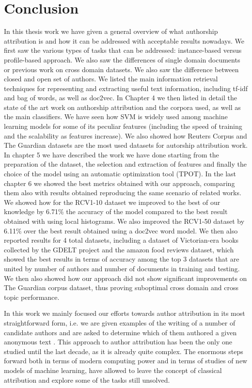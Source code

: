 \chapter{Conclusion}
In this thesis work we have given a general overview of what authorship attribution is and how it can be addressed with acceptable results nowadays.
We first saw the various types of tasks that can be addressed: instance-based versus profile-based approach. We also saw the differences of single domain documents or previous work on cross domain datasets. We also saw the difference between closed and open set of authors.
We listed the main information retrieval techniques for representing and extracting useful text information, including tf-idf and bag of words, as well as doc2vec.
In Chapter 4 we then listed in detail the state of the art work on authorship attribution and the corpora used, as well as the main classifiers. We have seen how SVM is widely used among machine learning models for some of its peculiar features (including the speed of training and the scalability as features increase). We also showed how Reuters Corpus and The Guardian datasets are the most used datasets for autorship attribution work.
In chapter 5 we have described the work we have done starting from the preparation of the dataset, the selection and extraction of features and finally the choice of the model using an automatic optimization tool (TPOT).
In the last chapter 6 we showed the best metrics obtained with our approach, comparing them also with results obtained reproducing the same scenario of related works.
We showed how for the RCV1-10 dataset we improved to the best of our knowledge by 6.71\% the accuracy of the model compared to the best result obtained with using local histograms. We also improved the RCV1-50 dataset by 6.11\% over the best result obtained using a doc2vec word model.
We then also reported results for 4 total datasets, including a dataset of Victorian-era books collected by the GDELT project and the amazon food reviews dataset, which showed the best results in terms of accuracy among the top 3 datasets that are united by number of authors and number of documents in training and testing.
We then also showed how our approach did not show significant improvements on The Guardian corpus dataset, thus proving suboptimal cross domain and cross topic performance.


In this work we mainly focused our efforts towards author attribution in its most straightforward form, i.e. we are given examples of the writing of a number of candidate authors and are asked
to determine which of them authored a given anonymous text \cite{koppel2009computational}.
This approach to author attribution has been the only one studied until the last decade, as it is already quite complex.
The enormous steps forward both in terms of modern computing power and in terms of studies of new models of machine learning, have allowed to leave the concept of classical attribution and explore some of the tasks still unsolved. 

